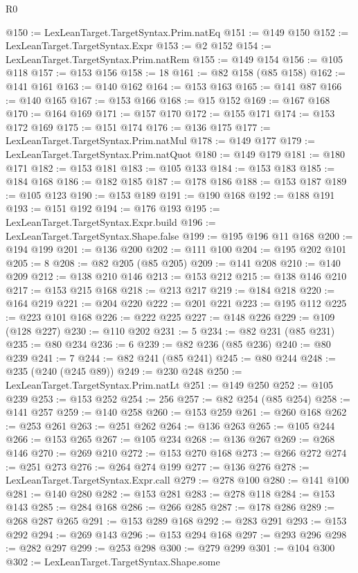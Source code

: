 \begin{lexlean}{R0}
\begin{coremodule}
@150 := LexLeanTarget.TargetSyntax.Prim.natEq
@151 := @149 @150
@152 := LexLeanTarget.TargetSyntax.Expr
@153 := @2 @152
@154 := LexLeanTarget.TargetSyntax.Prim.natRem
@155 := @149 @154
@156 := @105 @118
@157 := @153 @156
@158 := 18
@161 := @82 @158 (@85 @158)
@162 := @141 @161
@163 := @140 @162
@164 := @153 @163
@165 := @141 @87
@166 := @140 @165
@167 := @153 @166
@168 := @15 @152
@169 := @167 @168
@170 := @164 @169
@171 := @157 @170
@172 := @155 @171
@174 := @153 @172 @169
@175 := @151 @174
@176 := @136 @175
@177 := LexLeanTarget.TargetSyntax.Prim.natMul
@178 := @149 @177
@179 := LexLeanTarget.TargetSyntax.Prim.natQuot
@180 := @149 @179
@181 := @180 @171
@182 := @153 @181
@183 := @105 @133
@184 := @153 @183
@185 := @184 @168
@186 := @182 @185
@187 := @178 @186
@188 := @153 @187
@189 := @105 @123
@190 := @153 @189
@191 := @190 @168
@192 := @188 @191
@193 := @151 @192
@194 := @176 @193
@195 := LexLeanTarget.TargetSyntax.Expr.build
@196 := LexLeanTarget.TargetSyntax.Shape.false
@199 := @195 @196 @11 @168
@200 := @194 @199
@201 := @136 @200
@202 := @111 @100
@204 := @195 @202 @101
@205 := 8
@208 := @82 @205 (@85 @205)
@209 := @141 @208
@210 := @140 @209
@212 := @138 @210 @146
@213 := @153 @212
@215 := @138 @146 @210
@217 := @153 @215 @168
@218 := @213 @217
@219 := @184 @218
@220 := @164 @219
@221 := @204 @220
@222 := @201 @221
@223 := @195 @112
@225 := @223 @101 @168
@226 := @222 @225
@227 := @148 @226
@229 := @109 (@128 @227)
@230 := @110 @202
@231 := 5
@234 := @82 @231 (@85 @231)
@235 := @80 @234
@236 := 6
@239 := @82 @236 (@85 @236)
@240 := @80 @239
@241 := 7
@244 := @82 @241 (@85 @241)
@245 := @80 @244
@248 := @235 (@240 (@245 @89))
@249 := @230 @248
@250 := LexLeanTarget.TargetSyntax.Prim.natLt
@251 := @149 @250
@252 := @105 @239
@253 := @153 @252
@254 := 256
@257 := @82 @254 (@85 @254)
@258 := @141 @257
@259 := @140 @258
@260 := @153 @259
@261 := @260 @168
@262 := @253 @261
@263 := @251 @262
@264 := @136 @263
@265 := @105 @244
@266 := @153 @265
@267 := @105 @234
@268 := @136 @267
@269 := @268 @146
@270 := @269 @210
@272 := @153 @270 @168
@273 := @266 @272
@274 := @251 @273
@276 := @264 @274 @199
@277 := @136 @276
@278 := LexLeanTarget.TargetSyntax.Expr.call
@279 := @278 @100
@280 := @141 @100
@281 := @140 @280
@282 := @153 @281
@283 := @278 @118
@284 := @153 @143
@285 := @284 @168
@286 := @266 @285
@287 := @178 @286
@289 := @268 @287 @265
@291 := @153 @289 @168
@292 := @283 @291
@293 := @153 @292
@294 := @269 @143
@296 := @153 @294 @168
@297 := @293 @296
@298 := @282 @297
@299 := @253 @298
@300 := @279 @299
@301 := @104 @300
@302 := LexLeanTarget.TargetSyntax.Shape.some

\end{coremodule}
\end{lexlean}
